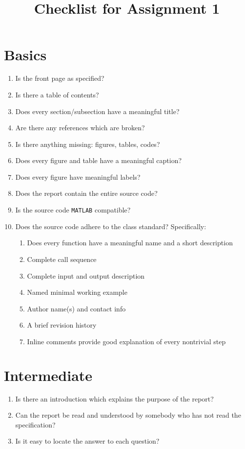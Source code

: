 \documentclass[a4paper,12pt]{article}
\title{Checklist for Assignment 1}
\date{\vspace{-5em}}
\begin{document}
\maketitle
\section{Basics}

\begin{enumerate}
\item Is the front page as specified?
\item Is there a table of contents?
\item Does every section/subsection have a meaningful title?
\item Are there any references which are broken?
\item Is there anything missing: figures, tables, codes?
\item Does every figure and table have a meaningful caption?
\item Does every figure have meaningful labels?
\item Does the report contain the entire source code?
\item Is the source code {\tt MATLAB} compatible?
\item Does the source code adhere to the class standard? Specifically:
  \begin{enumerate}
  \item Does every function have a meaningful name and a short description
  \item Complete call sequence
  \item Complete input and output description
  \item Named minimal working example
  \item Author name(s) and contact info
  \item A brief revision history
  \item Inline comments provide good explanation of every nontrivial step
  \end{enumerate}
\end{enumerate}

\section{Intermediate}

\begin{enumerate}
\item Is there an introduction which explains the purpose of the report?
\item Can the report be read and understood by somebody who has not read the specification?
\item Is it easy to locate the answer to each question?
\end{enumerate}
\end{document}
